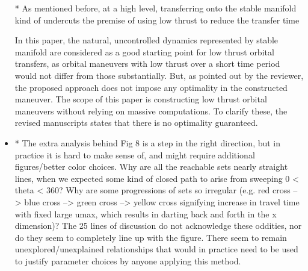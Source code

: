 \documentclass[11pt]{article}
\begin{document}
\begin{itemize}
\begin{itshape}
            * As mentioned before, at a high level, transferring onto the stable
            manifold kind of undercuts the premise of using low thrust to reduce the
            transfer time
        \end{itshape}

        In this paper, the natural, uncontrolled dynamics represented by stable manifold are considered as a good starting point for low thrust orbital transfers, as orbital maneuvers with low thrust over a short time period would not differ from those substantially. 
        But, as pointed out by the reviewer, the proposed approach does not impose any optimality in the constructed maneuver. 
        The scope of this paper is constructing low thrust orbital maneuvers without relying on massive computations. 
        To clarify these, the revised manuscripts states that there is no optimality guaranteed.

    \item
        \begin{itshape}

            * The extra analysis behind Fig 8 is a step in the right direction, but in
            practice it is hard to make sense of, and might require additional
            figures/better color choices.  Why are all the reachable sets nearly
            straight lines, when we expected some kind of closed path to arise from
            sweeping 0 < theta < 360?  Why are some progressions of sets so irregular
            (e.g. red cross --> blue cross --> green cross --> yellow cross signifying
            increase in travel time with fixed large umax, which results in darting
            back and forth in the x dimension)?  The 25 lines of discussion do not
            acknowledge these oddities, nor do they seem to completely line up with the
            figure.  There seem to remain unexplored/unexplained relationships that
            would in practice need to be used to justify parameter choices by anyone
            applying this method.   
        \end{itshape}
        

\end{itemize}
\end{document}
